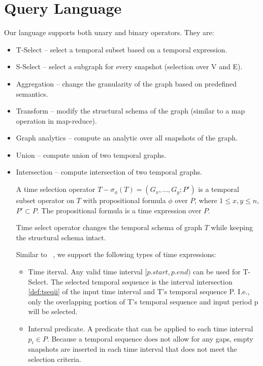 \section{Query Language}
\label{sec:lang}

Our language supports both unary and binary operators. They are:
\begin{itemize}
\item T-Select -- select a temporal subset based on a temporal expression.
\item S-Select -- select a subgraph for every snapshot (selection over V and E).
\item Aggregation -- change the granularity of the graph based on predefined semantics.
\item Transform -- modify the structural schema of the graph (similar to a map operation in map-reduce).
\item Graph analytics -- compute an analytic over all snapshots of the graph.
\item Union -- compute union of two temporal graphs.
\item Intersection -- compute intersection of two temporal graphs.

\begin{definition} [T-Select]
\label{def:tsel}
A time selection operator $T-\sigma_\phi(T) = (G_x, \ldots, G_y; P')$ is
a temporal subset operator on $T$ with propositional formula $\phi$
over $P$, where $1 \leq x,y \leq n$, $P' \subset P$.  The
propositional formula is a time expression over $P$.
\end{definition}

Time select operator changes the temporal schema of graph $T$ while
keeping the structural schema intact.

Similar to ~\cite{Khurana2013}, we support the following types of time expressions:

\begin{itemize}

\item Time iterval.  Any valid time interval $[p.start,p.end)$ can be
  used for T-Select.  The selected temporal sequence is the interval
  intersection \ref{def:tseqii} of the input time interval and T's
  temporal sequence P.  I.e., only the overlapping portion of T's
  temporal sequence and input period p will be selected.

\item Interval predicate.  A predicate that can be applied to each
  time interval $p_i \in P$.  Because a temporal sequence does not
  allow for any gaps, empty snapshots are inserted in each time
  interval that does not meet the selection criteria.  


\end{itemize}
\end{itemize}

